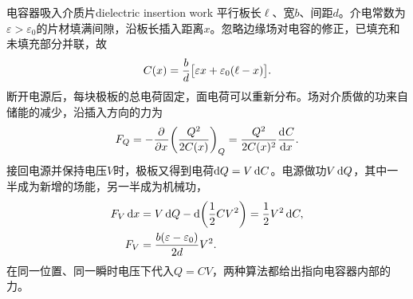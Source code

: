 \begin{example}{电容器吸入介质片}{dielectric insertion work}
    平行板长$\ell$、宽$b$、间距$d$。介电常数为$\varepsilon > \varepsilon_0$的片材填满间隙，沿板长插入距离$x$。忽略边缘场对电容的修正，已填充和未填充部分并联，故
    \[
        C(x) = \frac b d\bigl[\varepsilon x + \varepsilon_0(\ell - x)\bigr] .
    \]
    断开电源后，每块极板的总电荷固定，面电荷可以重新分布。场对介质做的功来自储能的减少，沿插入方向的力为
    \begin{equation}
        \label{eq:ed-fixed-charge-dielectric-force}
        F_Q = -\frac{\partial^{}}{\partial{x}^{}}\biggl(\frac{Q^2}{2C(x)}\biggr)_Q
            = \frac{Q^2}{2C(x)^2}\frac{\mathop{}\!\mathrm{d}^{}C}{\mathrm{d}{x}^{}} .
    \end{equation}
    接回电源并保持电压$V$时，极板又得到电荷$\mathop{}\!\mathrm{d} Q = V\mathop{}\!\mathrm{d} C$。电源做功$V\mathop{}\!\mathrm{d} Q$，其中一半成为新增的场能，另一半成为机械功，
    \begin{equation}
        \label{eq:ed-fixed-voltage-dielectric-force}
        \begin{aligned}
            F_V\mathop{}\!\mathrm{d} x &= V\mathop{}\!\mathrm{d} Q - \mathop{}\!\mathrm{d}\biggl(\frac12 CV^2\biggr) = \frac12 V^2\mathop{}\!\mathrm{d} C,\\
            F_V &= \frac{b(\varepsilon - \varepsilon_0)}{2d}V^2 .
        \end{aligned}
    \end{equation}
    在同一位置、同一瞬时电压下代入$Q = CV$，两种算法都给出指向电容器内部的力。
\end{example}
